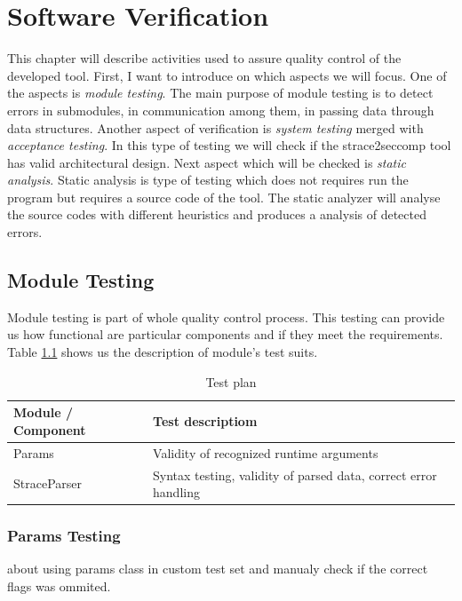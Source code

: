 \chapter{Software Verification}
This chapter will describe activities used to assure quality control of the developed tool.
First, I want to introduce on which aspects we will focus.
One of the aspects is \textit{module testing}.
The main purpose of module testing is to detect errors in submodules, in communication among them, in passing data through data structures.
Another aspect of verification is \textit{system testing} merged with \textit{acceptance testing}.
In this type of testing we will check if the strace2seccomp tool has valid architectural design.
Next aspect which will be checked is \textit{static analysis}.
Static analysis is type of testing which does not requires run the program but requires a source code of the tool.
The static analyzer will analyse the source codes with different heuristics and produces a analysis of detected errors. %



\section{Module Testing}
Module testing is part of whole quality control process.
This testing can provide us how functional are particular components and if they meet the requirements.
Table \ref{table:moduletesting} shows us the description of module's test suits.

\begin{table}[h]
	\centering
	\begin{tabular}{|l|p{10cm}|}
		\hline
		\textbf{Module / Component}	&	\textbf{Test descriptiom} \\ \hline
		Params 											& Validity of recognized runtime arguments \\ \hline
		StraceParser								& Syntax testing, validity of parsed data, correct error handling \\ \hline
	\end{tabular}
	\caption{Test plan}
	\label{table:moduletesting}
\end{table}

\subsection{Params Testing}
about using params class in custom test set and manualy check if the correct flags was ommited.

